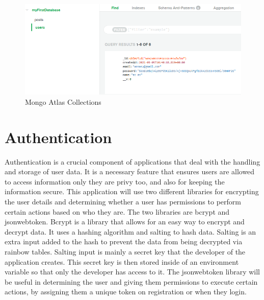 \begin{figure}
    \centering
    \includegraphics[scale=0.7]{img/database.png}
    \caption{Mongo Atlas Collections}
    \label{fig4:mongo}
\end{figure}

\section{Authentication}
Authentication is a crucial component of applications that deal with the handling and storage of user data. It is a necessary feature that ensures users are allowed to access information only they are privy too, and also for keeping the information secure. This application will use two different libraries for encrypting the user details and determining whether a user has permissions to perform certain actions based on who they are. The two libraries are bcrypt and jsonwebtoken. Bcrypt is a library that allows for an easy way to encrypt and decrypt data. It uses a hashing algorithm and salting to hash data. Salting is an extra input added to the hash to prevent the data from being decrypted via rainbow tables. Salting input is mainly a secret key that the developer of the application creates. This secret key is then stored inside of an environment variable so that only the developer has access to it. The jsonwebtoken library will be useful in determining the user and giving them permissions to execute certain actions, by assigning them a unique token on registration or when they login.

